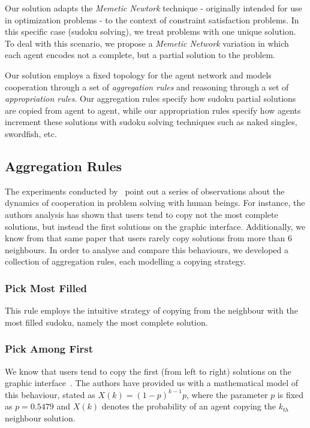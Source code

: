 \documentclass{article}
\begin{document}
Our solution adapts the {\em Memetic Newtork} technique - originally intended for use in optimization problems - to the context of constraint satisfaction problems. In this specific case (sudoku solving), we treat problems with one unique solution. To deal with this scenario, we propose a {\em Memetic Network} variation in which each agent encodes not a complete, but a partial solution to the problem.

Our solution employs a fixed topology for the agent network and models cooperation through a set of {\em aggregation rules} and reasoning through a set of {\em appropriation rules}. Our aggregation rules specify how sudoku partial solutions are copied from agent to agent, while our appropriation rules specify how agents increment these solutions with sudoku solving techniques such as naked singles, swordfish, etc.

\subsection{Aggregation Rules}

The experiments conducted by~\cite{farenzena:collabem} point out a series of observations about the dynamics of cooperation in problem solving with human beings. For instance, the authors analysis has shown that users tend to copy not the most complete solutions, but instead the first solutions on the graphic interface. Additionally, we know from that same paper that users rarely copy solutions from more than 6 neighbours. In order to analyse and compare this behaviours, we developed a collection of aggregation rules, each modelling a copying strategy.

\subsubsection{Pick Most Filled}

This rule employs the intuitive strategy of copying from the neighbour with the most filled sudoku, namely the most complete solution.

\subsubsection{Pick Among First}

We know that users tend to copy the first (from left to right) solutions on the graphic interface~\cite{farenzena:collabem}. The authors have provided us with a mathematical model of this behaviour, stated as $X(k) = (1-p)^{k-1}p$, where the parameter $p$ is fixed as $p = 0.5479$ and $X(k)$ denotes the probability of an agent copying the $k_{th}$ neighbour solution.
\end{document}
